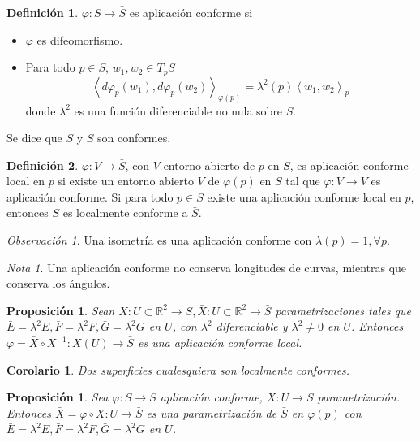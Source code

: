 \documentclass{report}
\newtheorem{corollary}[theorem]{Corolario}
\newtheorem{proposition}[theorem]{Proposición}
\theoremstyle{remark}
\newtheorem*{remark}{Observación}
\theoremstyle{remark}
\newtheorem*{note}{Nota}
\theoremstyle{definition}
\newtheorem{definition}{Definición}[chapter]
\theoremstyle{definition}
\theoremstyle{definition}
\begin{document}
\begin{definition}
    $\varphi: S \to \bar{S}$ es aplicación conforme si
    \begin{itemize}
        \item $\varphi$ es difeomorfismo.
        \item Para todo $p \in S$, $w_1, w_2 \in T_pS$
              $$\left\langle d\varphi_p(w_1), d\varphi_p(w_2) \right\rangle _{\varphi(p)} = \lambda^2(p) \left\langle w_1, w_2 \right\rangle _p$$
              donde $\lambda^2$ es una función diferenciable no nula sobre $S$.
    \end{itemize}
    Se dice que $S$ y $\bar{S}$ son conformes.
\end{definition}

\begin{definition}
    $\varphi: V \to \bar{S}$, con $V$ entorno abierto de $p$ en $S$, es aplicación conforme local en $p$ si existe un entorno abierto $\bar{V}$ de $\varphi(p)$ en $\bar{S}$ tal que $\varphi: V \to \bar{V}$ es aplicación conforme.
    Si para todo $p \in S$ existe una aplicación conforme local en $p$, entonces $S$ es localmente conforme a $\bar{S}$.
\end{definition}

\begin{remark}
    Una isometría es una aplicación conforme con $\lambda(p) = 1, \forall p$.
\end{remark}

\begin{note}
    Una aplicación conforme no conserva longitudes de curvas, mientras que conserva los ángulos.
\end{note}

\begin{proposition}
    Sean $X: U \subset \mathbb{R}^2 \to S, \bar{X}: U \subset \mathbb{R}^2 \to \bar{S}$ parametrizaciones tales que $\bar{E} = \lambda^2 E, \bar{F} = \lambda^2 F, \bar{G} = \lambda^2 G$ en $U$, con $\lambda^2$ diferenciable y $\lambda^2 \neq 0$ en $U$.
    Entonces $\varphi = \bar{X} \circ X^{-1}: X(U) \to \bar{S}$ es una aplicación conforme local.
\end{proposition}

\begin{corollary}
    Dos superficies cualesquiera son localmente conformes.
\end{corollary}

\begin{proposition}
    Sea $\varphi: S \to \bar{S}$ aplicación conforme, $X: U \to S$ parametrización.
    Entonces $\bar{X} = \varphi \circ X: U \to \bar{S}$ es una parametrización de $\bar{S}$ en $\varphi(p)$ con $\bar{E} = \lambda^2 E, \bar{F} = \lambda^2 F, \bar{G} = \lambda^2 G$ en $U$.
\end{proposition}
\end{document}
